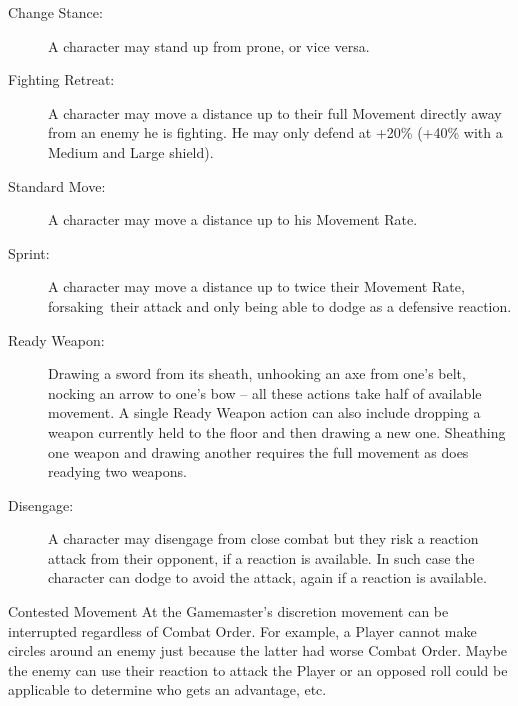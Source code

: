 \begin{description}
\item[Change Stance:] A character may stand up from prone, or vice versa.
\item[Fighting Retreat:] A character may move a distance up to their full Movement directly away from an enemy he is fighting. He may only defend at +20\% (+40\% with a Medium and Large shield).
\item[Standard Move:] A character may move a distance up to his Movement Rate.
\item[Sprint:] A character may move a distance up to twice their Movement Rate, forsaking their attack and only being able to dodge as a defensive reaction.
\item[Ready Weapon:] Drawing a sword from its sheath, unhooking an axe from one’s belt, nocking an arrow to one’s bow – all these actions take half of available movement. A single Ready Weapon action can also include dropping a weapon currently held to the floor and then drawing a new one. Sheathing one weapon and drawing another requires the full movement as does readying two weapons.
\item[Disengage:] A character may disengage from close combat but they risk a reaction attack from their opponent, if a reaction is available. In such case the character can dodge to avoid the attack, again if a reaction is available.
\end{description}

\begin{rpg-titlebox}{Contested Movement}
At the Gamemaster's discretion movement can be interrupted regardless of Combat Order. For example, a Player cannot make circles around an enemy just because the latter had worse Combat Order. Maybe the enemy can use their reaction to attack the Player or an opposed roll could be applicable to determine who gets an advantage, etc.
\end{rpg-titlebox}


